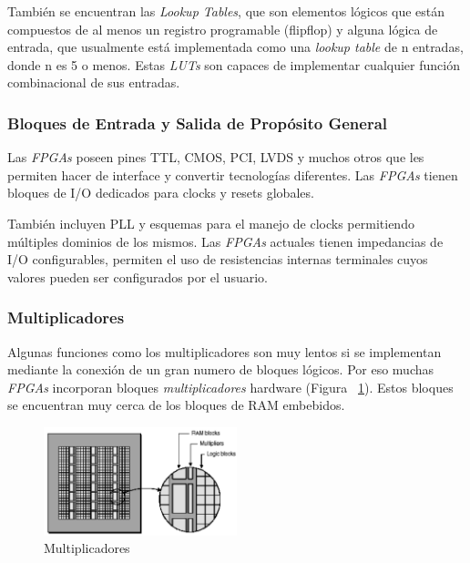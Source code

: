 		\vspace{0.5cm}
		\par
		También se encuentran las \textit{Lookup Tables}, que son elementos lógicos que están compuestos de al menos un registro programable (flip\-flop) y
		alguna lógica de entrada, que usualmente está implementada como una \textit{lookup table} de n entradas, donde n es 5 o menos. Estas \textit{LUTs}
		son capaces de implementar cualquier función combinacional de sus entradas.

		\subsubsection{Bloques de Entrada y Salida de Propósito General}
		\par
		Las \textit{FPGAs} poseen pines TTL, CMOS, PCI, LVDS y muchos otros que les permiten hacer de interface y convertir tecnologías diferentes.
		Las \textit{FPGAs} tienen bloques de I/O dedicados para clocks y resets globales.
		\vspace{0.5cm}
		\par
		También incluyen PLL y esquemas para el manejo de clocks permitiendo múltiples dominios de los mismos. Las \textit{FPGAs} actuales tienen
		impedancias de I/O configurables, permiten el uso de resistencias internas terminales cuyos valores pueden ser configurados por el usuario.

		\subsubsection{Multiplicadores}
		\par
		Algunas funciones como los multiplicadores son muy lentos si se implementan mediante la conexión de un gran numero de bloques lógicos. Por eso
		muchas \textit{FPGAs} incorporan bloques \textit{multiplicadores} hardware (Figura ~\ref{fig:mult}). Estos bloques se encuentran muy cerca de los
		bloques de RAM embebidos.
		
		\begin{figure}[h!]
 		\begin{center}
 		\includegraphics[width=0.5\textwidth,keepaspectratio=true]{./images/multram}
  		\caption{Multiplicadores}
  		\label{fig:mult}
 		\end{center}
		\end{figure}

